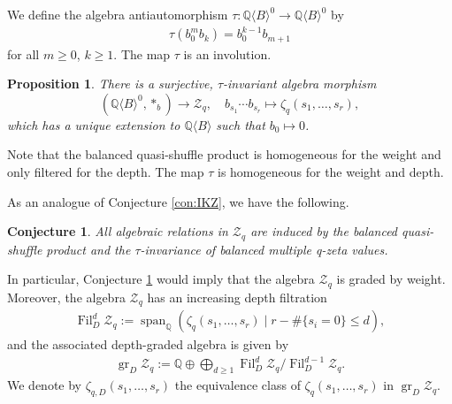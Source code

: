 \documentclass[11pt, a4paper]{amsart}
\newtheorem{prop}[thm]{Proposition}
\newtheorem{conj}[thm]{Conjecture}
\numberwithin{equation}{section}
\theoremstyle{definition}
\newcommand{\Q}{\mathbb{Q}}
\newcommand{\qMZV}{\mathcal{Z}_q}
\newcommand{\grqMZV}{\operatorname{gr}_D\mathcal{Z}_q}
\newcommand{\QB}{\Q\langle B\rangle}
\begin{document}
We define the algebra antiautomorphism $\tau:\QB^0\to \QB^0$ by
\begin{align*} %
\tau(b_0^mb_k)=b_0^{k-1}b_{m+1}
\end{align*}
for all $m\geq0$, $k\geq1$. The map $\tau$ is an involution.
\begin{prop} \label{prop:balanced_qsh_tau_inv}
There is a surjective, $\tau$-invariant algebra morphism
\[
(\QB^0,\ast_b)\to \qMZV,\quad b_{s_1}\cdots b_{s_r}\mapsto \zeta_q(s_1,\ldots,s_r),
\]
which has a unique extension to $\QB$ such that $b_0\mapsto0$.
\end{prop}
Note that the balanced quasi-shuffle product is homogeneous for the weight and only filtered for the depth. The map $\tau$ is homogeneous for the weight and depth.

As an analogue of Conjecture \ref{con:IKZ}, we have the following.
\begin{conj} \label{con:rel_in_qMZV}
All algebraic relations in $\qMZV$ are induced by the balanced quasi-shuffle product and the $\tau$-invariance of balanced multiple q-zeta values.
\end{conj}

In particular, Conjecture \ref{con:rel_in_qMZV} would imply that the algebra $\qMZV$ is graded by weight. Moreover, the algebra $\qMZV$ has an increasing depth filtration
\begin{align*}
\operatorname{Fil}_D^d\qMZV := \operatorname{span}_\Q(\zeta_q(s_1,\ldots,s_r)\mid r-\#\{s_i=0\}\leq d),
\end{align*}
and the associated depth-graded algebra is given by
\begin{align*}
\grqMZV := \Q\oplus\bigoplus_{d\geq1} \operatorname{Fil}_D^d\qMZV/\operatorname{Fil}_D^{d-1}\qMZV.
\end{align*}
We denote by $\zeta_{q,D}(s_1,\ldots,s_r)$ the equivalence class of $\zeta_q(s_1,\ldots,s_r)$ in $\grqMZV$.
\end{document}
